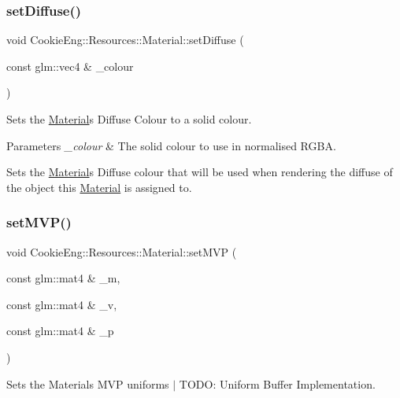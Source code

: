 \subsubsection{\texorpdfstring{set\+Diffuse()}{setDiffuse()}\hspace{0.1cm}{\footnotesize\ttfamily [2/2]}}
{\footnotesize\ttfamily void Cookie\+Eng\+::\+Resources\+::\+Material\+::set\+Diffuse (\begin{DoxyParamCaption}\item[{const glm\+::vec4 \&}]{\+\_\+colour }\end{DoxyParamCaption})}



Sets the \hyperlink{class_cookie_eng_1_1_resources_1_1_material}{Material}\textquotesingle{}s Diffuse Colour to a solid colour. 


\begin{DoxyParams}{Parameters}
{\em \+\_\+colour} & The solid colour to use in normalised R\+G\+BA.\\
\hline
\end{DoxyParams}
Sets the \hyperlink{class_cookie_eng_1_1_resources_1_1_material}{Material}\textquotesingle{}s Diffuse colour that will be used when rendering the diffuse of the object this \hyperlink{class_cookie_eng_1_1_resources_1_1_material}{Material} is assigned to. \mbox{\label{class_cookie_eng_1_1_resources_1_1_material_a68279187d2c08bd49a7ee1994c1f2c5d}} 
\subsubsection{\texorpdfstring{set\+M\+V\+P()}{setMVP()}}
{\footnotesize\ttfamily void Cookie\+Eng\+::\+Resources\+::\+Material\+::set\+M\+VP (\begin{DoxyParamCaption}\item[{const glm\+::mat4 \&}]{\+\_\+m,  }\item[{const glm\+::mat4 \&}]{\+\_\+v,  }\item[{const glm\+::mat4 \&}]{\+\_\+p }\end{DoxyParamCaption})}



Sets the Materials M\+VP uniforms $\vert$ T\+O\+DO\+: Uniform Buffer Implementation. 


